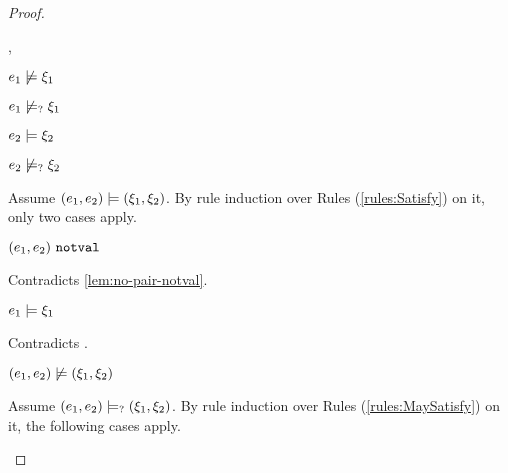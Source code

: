 \begin{proof}
\begin{byCases}
\begin{byCases}
\begin{byCases}
        \item[\cnotsatisfyormay{e_1}{\xi_1},\csatisfy{e_2}{\xi_2}]
            \begin{pfsteps*}
            \item $e_1 \not\models \xi_1$  
            \item $e_1 \not\models_{?} \xi_1$  
            \item $e_2 \models \xi_2$  
            \item $e_2 \not\models_{?} \xi_2$  
            \end{pfsteps*}
            Assume $(e_1 , e_2) \models (\xi_1 , \xi_2)$. By rule induction over Rules (\ref{rules:Satisfy}) on it, only two cases apply. 
           \begin{byCases}
            \item[\text{(\ref{rule:CSNotValPair})}]
                \begin{pfsteps*}
                \item $(e_1 , e_2) ~\mathtt{notval}$ 
                \end{pfsteps*}
                Contradicts \autoref{lem:no-pair-notval}.
            \item[\text{(\ref{rule:CSPair})}]
                \begin{pfsteps*}
                \item $e_1 \models \xi_1$ 
                \end{pfsteps*}
                Contradicts .
            \end{byCases}
            \begin{pfsteps*}
            \item $(e_1 , e_2) \not\models (\xi_1 , \xi_2)$  
            \end{pfsteps*}
            Assume $(e_1 , e_2) \models_{?} (\xi_1 , \xi_2)$. By rule induction over Rules (\ref{rules:MaySatisfy}) on it, the following cases apply.
            \begin{byCases}
            \item[\text{(\ref{rule:CMSNotVal})}]
                \begin{pfsteps*}

\end{pfsteps*}
\end{byCases}
\end{byCases}
\end{byCases}
\end{byCases}
\end{proof}
